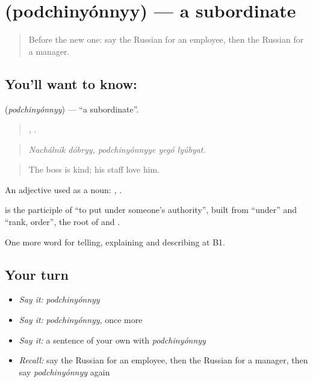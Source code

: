 \section[\texorpdfstring{\ru{подчинённый} (podchinyónnyy)}{подчинённый (podchinyónnyy)}]{ (podchinyónnyy) — a subordinate}

\label{lesson:RU-C357-podchinyonnyy}



\begin{quote}
Before the new one: say the Russian for an employee, then the Russian for a manager.
\end{quote}

\subsection*{You'll want to know: }
\textbf{} (\emph{podchinyónnyy}) — \textquotedblleft{}a subordinate\textquotedblright{}.

\begin{quote}
 ,   .
\end{quote}

\begin{quote}
\emph{Nachálnik dóbryy, podchinyónnyye yegó lyúbyat.}
\end{quote}

\begin{quote}
The boss is kind; his staff love him.
\end{quote}

An adjective used as a noun: \emph{ ,  }.

\begin{cousinweb}
\textbf{} is the participle of \emph{} \textquotedblleft{}to put under someone’s authority\textquotedblright{}, built from \emph{} \textquotedblleft{}under\textquotedblright{} and \emph{} \textquotedblleft{}rank, order\textquotedblright{}, the root of \emph{} and \emph{}.
\end{cousinweb}

\begin{grammarlens}[title={What you've built}]
One more word for telling, explaining and describing at B1.
\end{grammarlens}

\subsection*{Your turn}
\begin{itemize}
\raggedright
  \item \emph{Say it:} \emph{podchinyónnyy}
  \item \emph{Say it:} \emph{podchinyónnyy}, once more
  \item \emph{Say it:} a sentence of your own with \emph{podchinyónnyy}
  \item \emph{Recall:} say the Russian for an employee, then the Russian for a manager, then say \emph{podchinyónnyy} again
\end{itemize}

